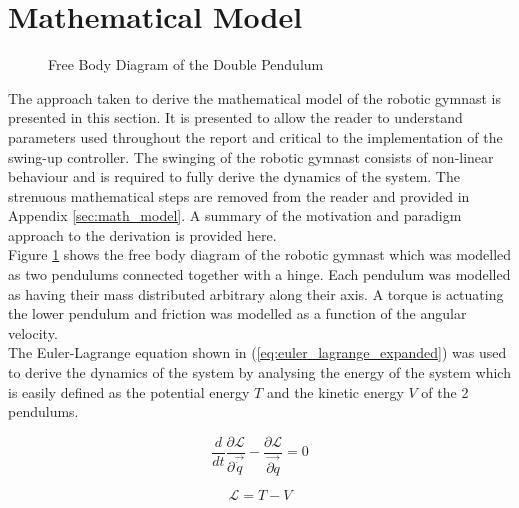 \section{Mathematical Model}
\label{sec:mathematical_model}
\begin{figure}[h]
	\centering
	
	\caption{Free Body Diagram of the Double Pendulum}
	\label{fig:doublePen}
\end{figure}

The approach taken to derive the mathematical model of the robotic gymnast is presented in this section. It is presented to allow the reader to understand parameters used throughout the report and critical to the implementation of the swing-up controller. The swinging of the robotic gymnast consists of non-linear behaviour and is required to fully derive the dynamics of the system. The strenuous mathematical steps are removed from the reader and provided in Appendix \ref{sec:math_model}. A summary of the motivation and paradigm approach to the derivation is provided here.\\

 Figure \ref{fig:doublePen} shows the free body diagram of the robotic gymnast which was modelled as two pendulums connected together with a hinge. Each pendulum was modelled as having their mass distributed arbitrary along their axis. A torque is actuating the lower pendulum and friction was modelled as a function of the angular velocity.\\

The Euler-Lagrange equation shown in (\ref{eq:euler_lagrange_expanded}) was used to derive the dynamics of the system by analysing the energy of the system which is easily defined as the potential energy $T$ and the kinetic energy $V$ of the 2 pendulums.
 
\begin{equation} \label{eq:euler_lagrange_expanded}
\frac{d}{dt}\frac{\partial\mathcal{L}}{\partial\vec{\dot{q}}}-\frac{\partial\mathcal{L}}{ \vec{\partial q}} = 0
\end{equation}

\begin{equation} \label{eq:euler_lagrane}
\mathcal{L}=T-V
\end{equation}

